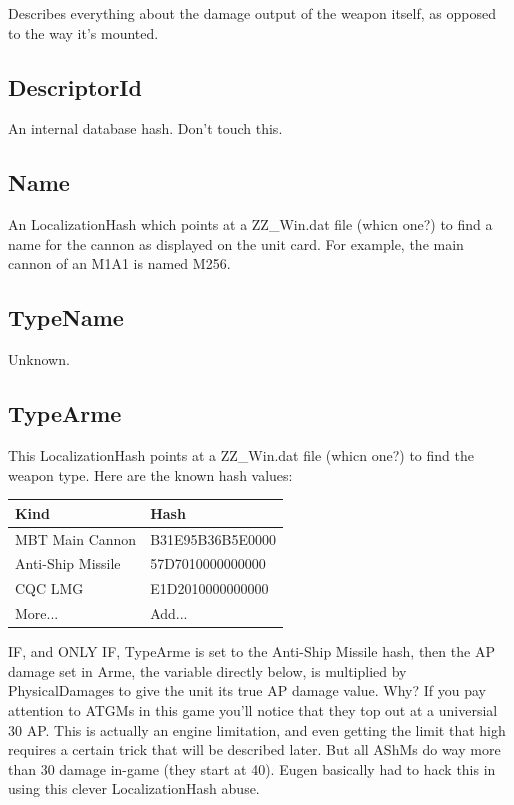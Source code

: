 \documentclass{article}
\begin{document}
Describes everything about the damage output of the weapon itself, as opposed to the way it's mounted.

\subsection{DescriptorId}

An internal database hash. Don't touch this.

\subsection{Name}

An LocalizationHash which points at a ZZ\_Win.dat file (whicn one?)  to find a name for the cannon as displayed on the unit card. For example, the main cannon of an M1A1 is named M256.

\subsection{TypeName}

Unknown.

\subsection{TypeArme}

This LocalizationHash points at a ZZ\_Win.dat file (whicn one?) to find the weapon type. Here are the known hash values:

\begin{center}
    \begin{tabular}{ | l | l |}
    \hline
	Kind & Hash\\ \hline
	MBT Main Cannon & B31E95B36B5E0000\\
	Anti-Ship Missile & 57D7010000000000\\
	CQC LMG & E1D2010000000000\\
	More... & Add...\\
    \hline
    \end{tabular}
\end{center}

IF, and ONLY IF, TypeArme is set to the Anti-Ship Missile hash, then the AP damage set in Arme, the variable directly below, is multiplied by PhysicalDamages to give the unit its true AP damage value. Why? If you pay attention to ATGMs in this game you'll notice that they top out at a universial 30 AP. This is actually an engine limitation, and even getting the limit that high requires a certain trick that will be described later. But all AShMs do way more than 30 damage in-game (they start at 40). Eugen basically had to hack this in using this clever LocalizationHash abuse.
\end{document}
